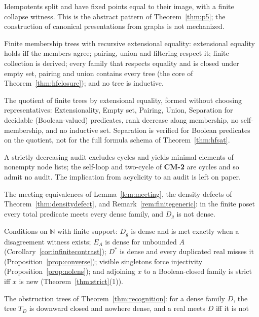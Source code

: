 \documentclass[11pt]{article}
\theoremstyle{definition}
\begin{document}
\begin{description}[leftmargin=1.2em, itemsep=2pt]
\item[\texttt{Packaging}.] Idempotents split and have fixed points equal to their image, with a
finite collapse witness. This is the abstract pattern of Theorem~\ref{thm:p5}; the construction
of canonical presentations from graphs is not mechanized.
\item[\texttt{HFClosure}.] Finite membership trees with recursive extensional equality:
extensional equality holds iff the members agree; pairing, union and filtering respect it;
finite collection is derived; every family that respects equality and is closed under empty set,
pairing and union contains every tree (the core of Theorem~\ref{thm:hfclosure}); and no tree is
inductive.
\item[\texttt{HFSets}.] The quotient of finite trees by extensional equality, formed without
choosing representatives: Extensionality, Empty set, Pairing, Union, Separation for decidable
(Boolean-valued) predicates, rank decrease along membership, no self-membership, and no inductive
set. Separation is verified for Boolean predicates on the quotient, not for the full formula
schema of Theorem~\ref{thm:hfsat}.
\item[\texttt{RankAudit}.] A strictly decreasing audit excludes cycles and yields minimal
elements of nonempty node lists; the self-loop and two-cycle of \textbf{CM-2} are cycles and so
admit no audit. The implication from acyclicity to an audit is left on paper.
\item[\texttt{FiniteCohen}.] The meeting equivalences of Lemma~\ref{lem:meeting}, the density
defects of Theorem~\ref{thm:densitydefect}, and Remark~\ref{rem:finitegeneric}: in the finite poset
every total predicate meets every dense family, and $D_g$ is not dense.
\item[\texttt{CohenBoundary}.] Conditions on $\mathbb N$ with finite support: $D_g$ is dense and is
met exactly when a disagreement witness exists; $E_A$ is dense for unbounded $A$
(Corollary~\ref{cor:infinitecontrast}); $D^\ast$ is dense and every duplicated real misses it
(Proposition~\ref{prop:converse}); visible singletons force injectivity
(Proposition~\ref{prop:nolens}); and adjoining $x$ to a Boolean-closed family is strict iff $x$ is
new (Theorem~\ref{thm:strict}(1)).
\item[\texttt{CohenRecognition}.] The obstruction trees of Theorem~\ref{thm:recognition}: for a dense
family $D$, the tree $T_D$ is downward closed and nowhere dense, and a real meets $D$ iff it is not

\end{description}
\end{document}
